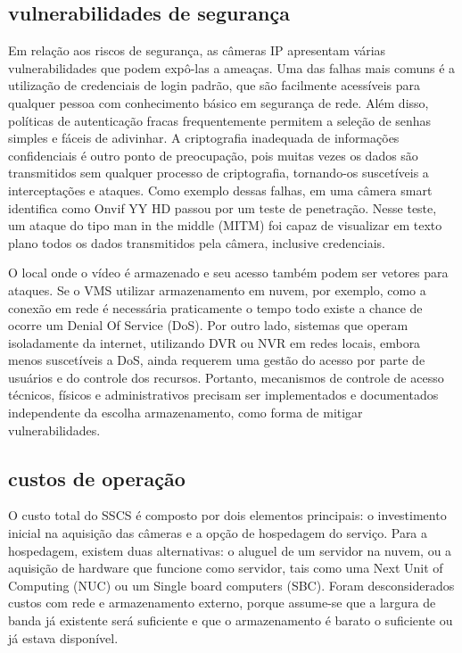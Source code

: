 \documentclass[12pt, %
openright, 
oneside, %
a4paper,    %
brazil]{facom-ufu-abntex2}
\begin{document}
\subsection{vulnerabilidades de segurança}

Em relação aos riscos de segurança, as câmeras IP apresentam várias
vulnerabilidades que podem expô-las a ameaças. Uma das falhas mais comuns é a
utilização de credenciais de login padrão, que são facilmente acessíveis para
qualquer pessoa com conhecimento básico em segurança de rede. Além disso,
políticas de autenticação fracas frequentemente permitem a seleção de senhas
simples e fáceis de adivinhar. A criptografia inadequada de informações
confidenciais é outro ponto de preocupação, pois muitas vezes os dados são
transmitidos sem qualquer processo de criptografia, tornando-os suscetíveis a
interceptações e ataques. Como exemplo dessas falhas, em 
uma câmera smart identifica como Onvif YY HD passou por um teste de penetração.
Nesse teste, um ataque do tipo man in the middle (MITM) foi capaz de visualizar
em texto plano todos os dados transmitidos pela câmera, inclusive credenciais.

O local onde o vídeo é armazenado e seu acesso também podem ser vetores para
ataques. Se o VMS utilizar armazenamento em nuvem, por exemplo, como a conexão
em rede é necessária praticamente o tempo todo existe a chance de ocorre um
Denial Of Service (DoS). Por outro lado, sistemas que operam isoladamente da
internet, utilizando DVR ou NVR em redes locais, embora menos suscetíveis a
DoS, ainda requerem uma gestão do acesso por parte de usuários e do controle
dos recursos. Portanto, mecanismos de controle de acesso técnicos, físicos e
administrativos precisam ser implementados e documentados independente da
escolha armazenamento, como forma de mitigar vulnerabilidades.

\subsection{custos de operação}

O custo total do SSCS é composto por dois elementos principais: o investimento
inicial na aquisição das câmeras e a opção de hospedagem do serviço. Para a
hospedagem, existem duas alternativas: o aluguel de um servidor na nuvem, ou a
aquisição de hardware que funcione como servidor, tais como uma Next Unit of
Computing (NUC) ou um Single board computers (SBC). Foram desconsiderados
custos com rede e armazenamento externo, porque assume-se que a largura de
banda já existente será suficiente e que o armazenamento é barato o suficiente
ou já estava disponível.
\end{document}

